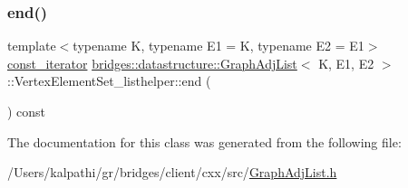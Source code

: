 \mbox{\label{classbridges_1_1datastructure_1_1_graph_adj_list_1_1_vertex_element_set__listhelper_ade98a69d94c58ec30a24f0ed802fe672}} 
\subsubsection{\texorpdfstring{end()}{end()}\hspace{0.1cm}{\footnotesize\ttfamily [2/2]}}
{\footnotesize\ttfamily template$<$typename K, typename E1 = K, typename E2 = E1$>$ \\
\mbox{\hyperlink{classbridges_1_1datastructure_1_1_graph_adj_list_1_1_vertex_element_set__listhelper_1_1const__iterator}{const\+\_\+iterator}} \mbox{\hyperlink{classbridges_1_1datastructure_1_1_graph_adj_list}{bridges\+::datastructure\+::\+Graph\+Adj\+List}}$<$ K, E1, E2 $>$\+::Vertex\+Element\+Set\+\_\+listhelper\+::end (\begin{DoxyParamCaption}{ }\end{DoxyParamCaption}) const\hspace{0.3cm}{\ttfamily [inline]}}



The documentation for this class was generated from the following file\+:\begin{DoxyCompactItemize}
\item 
/\+Users/kalpathi/gr/bridges/client/cxx/src/\mbox{\hyperlink{_graph_adj_list_8h}{Graph\+Adj\+List.\+h}}\end{DoxyCompactItemize}
